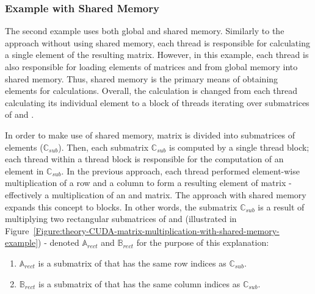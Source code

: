 \subsubsection{Example with Shared Memory}\label{Subsubsection:theory-CUDA-matrix-multiplication-example-with-shared-memory}
The second example uses both global and shared memory. Similarly to the approach without using shared memory, each thread is responsible for calculating a single element of the resulting  matrix. However, in this example, each thread is also responsible for loading elements of matrices  and  from global memory into shared memory. Thus, shared memory is the primary means of obtaining elements for calculations. Overall, the calculation is changed from each thread calculating its individual element to a block of threads iterating over submatrices of  and .
\par In order to make use of shared memory, matrix  is divided into submatrices of  elements ($ \mathbb{C}_{sub} $). Then, each submatrix $ \mathbb{C}_{sub} $ is computed by a single thread block; each thread within a thread block is responsible for the computation of an element in $ \mathbb{C}_{sub} $. In the previous approach, each thread performed element-wise multiplication of a row and a column to form a resulting element of matrix  - effectively a multiplication of an  and  matrix. The approach with shared memory expands this concept to blocks. In other words, the submatrix $ \mathbb{C}_{sub} $ is a result of multiplying two rectangular submatrices of  and  (illustrated in Figure~\ref{Figure:theory-CUDA-matrix-multiplication-with-shared-memory-example}) - denoted $ \mathbb{A}_{rect} $ and $ \mathbb{B}_{rect} $ for the purpose of this explanation:

\begin{enumerate}
	\item $ \mathbb{A}_{rect} $ is a  submatrix of  that has the same row indices as $ \mathbb{C}_{sub} $.
	\item $ \mathbb{B}_{rect} $ is a  submatrix of  that has the same column indices as $ \mathbb{C}_{sub} $.
\end{enumerate}

